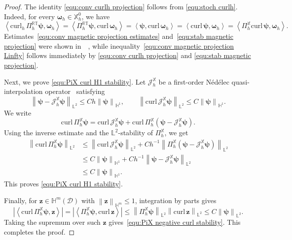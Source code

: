 \documentclass[11pt, reqno]{amsart}
\theoremstyle{definition}
\numberwithin{equation}{section}
\newcommand{\curl}{\mathrm{curl}\,}
\newcommand{\bff}{\boldsymbol}
\newcommand{\bb}{\mathbb}
\newcommand{\norm}[2]{\left\|{#1}\right\|_{#2}}
\newcommand{\inpro}[2]{\left\langle#1,#2\right\rangle}
\newcommand{\abs}[1]{\left|{#1}\right|}
\newcommand{\curlh}{\mathrm{curl}_h\,}
\begin{document}
\begin{proof}
	The identity \eqref{equ:conv curlh projection} follows from \eqref{equ:stoch curlh}. Indeed, for every $\bff{\omega}_h\in\bb{X}_h^0$, we have
	\[
	\inpro{\curlh\Pi_h^{\bb{RT}}\bff{\psi}}{\bff{\omega}_h}
	=
	\inpro{\Pi_h^{\bb{RT}}\bff{\psi}}{\curl\bff{\omega}_h}
	=
	\inpro{\bff{\psi}}{\curl\bff{\omega}_h}
	=
	\inpro{\curl\bff{\psi}}{\bff{\omega}_h}
	=
	\inpro{\Pi_h^{\bb{X}}\curl\bff{\psi}}{\bff{\omega}_h}.
	\]
	Estimates~\eqref{equ:conv magnetic projection estimates} and~\eqref{equ:stab magnetic projection} were shown in~~\cite{VeiGomPerZam26,VeiHuMas25}, while inequality~\eqref{equ:conv magnetic projection Linfty} follows immediately by \eqref{equ:conv curlh projection} and \eqref{equ:stab magnetic projection}.
	
	Next, we prove \eqref{equ:PiX curl H1 stability}. Let
	$\mathcal J_h^{\bb X}$ be a first-order N\'ed\'elec quasi-interpolation operator~\cite{ErnGue18} satisfying
	\[
	\norm{\bff \psi-\mathcal J_h^{\bb X}\bff \psi}{\bb L^2}
	\le
	Ch\norm{\bff \psi}{\bb H^1},
	\qquad
	\norm{\curl\mathcal J_h^{\bb X}\bff \psi}{\bb L^2}
	\le
	C\norm{\bff \psi}{\bb H^1}.
	\]
	We write
	\[
	\curl\Pi_h^{\bb X}\bff \psi
	=
	\curl\mathcal J_h^{\bb X}\bff \psi
	+
	\curl \Pi_h^{\bb X} \left(\bff \psi-\mathcal J_h^{\bb X}\bff \psi\right).
	\]
	Using the inverse estimate and the $\bb L^2$-stability of
	$\Pi_h^{\bb X}$, we get
	\[
	\begin{aligned}
		\norm{\curl\Pi_h^{\bb X}\bff \psi}{\bb L^2}
		&\le
		\norm{\curl\mathcal J_h^{\bb X}\bff \psi}{\bb L^2}
		+
		Ch^{-1}
		\norm{\Pi_h^{\bb X}\left(\bff \psi-\mathcal J_h^{\bb X}\bff \psi\right)}
		{\bb L^2}
		\\
		&\le
		C\norm{\bff \psi}{\bb H^1}
		+
		Ch^{-1}
		\norm{\bff \psi-\mathcal J_h^{\bb X}\bff \psi}{\bb L^2}
		\\
		&\le
		C\norm{\bff \psi}{\bb H^1}.
	\end{aligned}
	\]
	This proves \eqref{equ:PiX curl H1 stability}.
	
	Finally, for $\bff z \in\bb H^m(\mathscr D)$ with
	$\norm{\bff z}{\bb H^m}\le1$, integration by parts gives
	\[
	\abs{\inpro{\curl\Pi_h^{\bb X}\bff \psi}{\bff z}}
	=
	\abs{\inpro{\Pi_h^{\bb X}\bff \psi}{\curl\bff z}}
	\le
	\norm{\Pi_h^{\bb X}\bff \psi}{\bb L^2}
	\norm{\curl \bff z}{\bb L^2}
	\le
	C\norm{\bff \psi}{\bb L^2}.
	\]
	Taking the supremum over such $\bff z$ gives~\eqref{equ:PiX negative curl stability}. This completes the proof.
\end{proof}
\end{document}
